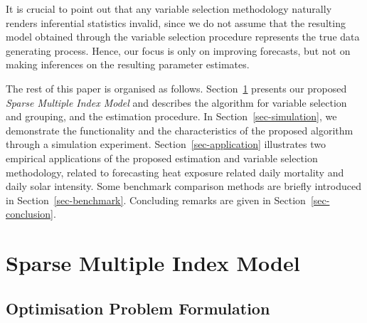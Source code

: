 \documentclass[
  11pt,
  a4paper,
]{article}
\begin{document}
It is crucial to point out that any variable selection methodology
naturally renders inferential statistics invalid, since we do not assume
that the resulting model obtained through the variable selection
procedure represents the true data generating process. Hence, our focus
is only on improving forecasts, but not on making inferences on the
resulting parameter estimates.

The rest of this paper is organised as follows. Section~\ref{sec-SMI}
presents our proposed \emph{Sparse Multiple Index Model} and describes
the algorithm for variable selection and grouping, and the estimation
procedure. In Section~\ref{sec-simulation}, we demonstrate the
functionality and the characteristics of the proposed algorithm through
a simulation experiment. Section~\ref{sec-application} illustrates two
empirical applications of the proposed estimation and variable selection
methodology, related to forecasting heat exposure related daily
mortality and daily solar intensity. Some benchmark comparison methods
are briefly introduced in Section~\ref{sec-benchmark}. Concluding
remarks are given in Section~\ref{sec-conclusion}.

\section{Sparse Multiple Index Model}\label{sec-SMI}

\subsection{Optimisation Problem
Formulation}\label{optimisation-problem-formulation}
\end{document}

